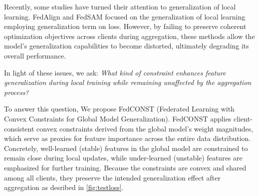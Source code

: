 \documentclass{article}
\theoremstyle{plain}
\theoremstyle{definition}
\theoremstyle{remark}
\begin{document}
Recently, some studies  have turned their attention to generalization of local learning. FedAlign\cite{fedalign} and FedSAM\cite{fedsam} focused on the generalization of local learning employing generalization term on loss. However, by failing to preserve coherent optimization objectives across clients during aggregation, these methods allow the model’s generalization capabilities to become distorted, ultimately degrading its overall performance.



In light of these issues, we ask: \textit{What kind of constraint enhances feature generalization during local training while remaining unaffected by the aggregation process?} 

To answer this question, We propose FedCONST (Federated Learning with Convex Constraints for Global Model Generalization). FedCONST applies client-consistent convex constraints derived from the global model’s weight magnitudes, which serve as proxies for feature importance across the entire data distribution. Concretely, well-learned (stable) features in the global model are constrained to remain close during local updates, while under-learned (unstable) features are emphasized for further training. Because the constraints are convex and shared among all clients, they preserve the intended generalization effect after aggregation as desribed in \cref{fig:testloss}.%
\end{document}
